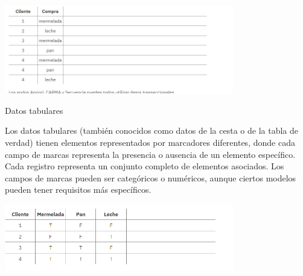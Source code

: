 \begin{itemize}
\begin{center}
	\includegraphics[width=10cm]{./Imagenes/33} 
\end{center}

Datos tabulares

Los datos tabulares (también conocidos como datos de la cesta o de la tabla de verdad) tienen elementos representados por marcadores diferentes, donde cada campo de marcas representa la presencia o ausencia de un elemento específico. Cada registro representa un conjunto completo de elementos asociados. Los campos de marcas pueden ser categóricos o numéricos, aunque ciertos modelos pueden tener requisitos más específicos.

\begin{center}
	\includegraphics[width=10cm]{./Imagenes/22} 
\end{center}



\end{itemize}